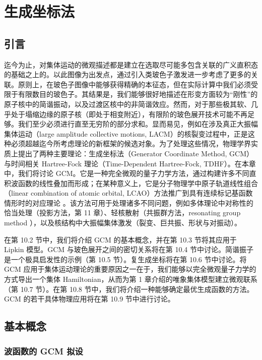 
\chapter{生成坐标法\label{chap:=00751F=006210=005750=006807=006CD5}}

\section{引言}

迄今为止，对集体运动的微观描述都是建立在选取尽可能多包含关联的广义直积态的基础之上的。以此图像为出发点，通过引入类玻色子激发进一步考虑了更多的关联。原则上，在玻色子图像中能够获得精确的本征态，但在实际计算中我们必须受限于有限数目的玻色子。其结果是，我们能够很好地描述在形变方面较为“刚性”的原子核中的简谐振动，以及过渡区核中的非简谐效应。然而，对于那些极其软、几乎处于塌缩边缘的原子核（即处于相变附近），有限阶的玻色展开技术可能不再足够。我们至少必须进行直至无穷阶的部分求和。显而易见，例如在涉及真正大振幅集体运动（large
amplitude collective motions, LACM）的核裂变过程中，正是这种必须超越迄今所考虑理论的新框架的候选对象。为了处理这些情况，物理学界实质上提出了两种主要理论：生成坐标法（Generator
Coordinate Method, GCM）与时间相关 Hartree-Fock 理论（Time-Dependent Hartree-Fock,
TDHF）。在本章中，我们将讨论 GCM。它是一种完全微观的量子力学方法，通过构建许多不同直积波函数的线性叠加而形成；在某种意义上，它是分子物理学中原子轨道线性组合（linear
combination of atomic orbital, LCAO）方法推广到具有连续标记基函数情形时的对应理论 \cite{MEL76}。该方法可用于处理诸多不同问题，例如多体理论中对称性的恰当处理（投影方法，第
11 章）、轻核散射（共振群方法，resonating group method \cite{HW53,Bi77}），以及核结构中大振幅集体激发（裂变、巨共振、形状与对振动）。

在第 10.2 节中，我们将介绍 GCM 的基本概念，并在第 10.3 节将其应用于 Lipkin 模型。GCM 与玻色展开之间的密切关系将在第
10.4 节中讨论。简谐振子是一个极具启发性的示例（第 10.5 节）。复生成坐标将在第 10.6 节中讨论。将 GCM 应用于集体运动理论的重要原因之一在于，我们能够以完全微观量子力学的方式导出一个集体
Hamiltonian，从而为第 1 章介绍的唯象集体模型建立微观联系（第 10.7 节）。在第 10.8 节中，我们将介绍一种能够确定最优生成函数的方法。GCM
的若干具体物理应用将在第 10.9 节中进行讨论。

\section{基本概念}

\subsection{波函数的 GCM 拟设}


